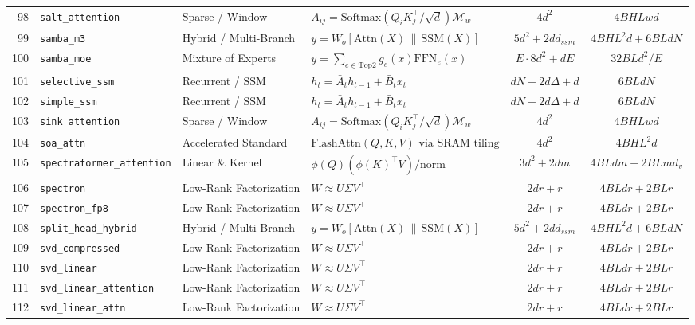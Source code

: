 \begin{center}
\begin{longtable}{rlllcc}
98 & \texttt{salt\_attention} & Sparse / Window & $A_{ij} = \text{Softmax}(Q_i K_j^\top / \sqrt{d}) \mathcal{M}_w$ & $4 d^2$ & $4 B H L w d$ \\
99 & \texttt{samba\_m3} & Hybrid / Multi-Branch & $y = W_o [\text{Attn}(X) \,\|\, \text{SSM}(X)]$ & $5 d^2 + 2 d d_{ssm}$ & $4 B H L^2 d + 6 B L d N$ \\
100 & \texttt{samba\_moe} & Mixture of Experts & $y = \sum_{e \in \text{Top2}} g_e(x) \text{FFN}_e(x)$ & $E \cdot 8 d^2 + d E$ & $32 B L d^2 / E$ \\
101 & \texttt{selective\_ssm} & Recurrent / SSM & $h_t = \bar{A}_t h_{t-1} + \bar{B}_t x_t$ & $d N + 2 d \Delta + d$ & $6 B L d N$ \\
102 & \texttt{simple\_ssm} & Recurrent / SSM & $h_t = \bar{A}_t h_{t-1} + \bar{B}_t x_t$ & $d N + 2 d \Delta + d$ & $6 B L d N$ \\
103 & \texttt{sink\_attention} & Sparse / Window & $A_{ij} = \text{Softmax}(Q_i K_j^\top / \sqrt{d}) \mathcal{M}_w$ & $4 d^2$ & $4 B H L w d$ \\
104 & \texttt{soa\_attn} & Accelerated Standard & $\text{FlashAttn}(Q,K,V) \text{ via SRAM tiling}$ & $4 d^2$ & $4 B H L^2 d$ \\
105 & \texttt{spectraformer\_attention} & Linear \& Kernel & $\phi(Q)(\phi(K)^\top V) / \text{norm}$ & $3 d^2 + 2 d m$ & $4 B L d m + 2 B L m d_v$ \\
106 & \texttt{spectron} & Low-Rank Factorization & $W \approx U \Sigma V^\top$ & $2 d r + r$ & $4 B L d r + 2 B L r$ \\
107 & \texttt{spectron\_fp8} & Low-Rank Factorization & $W \approx U \Sigma V^\top$ & $2 d r + r$ & $4 B L d r + 2 B L r$ \\
108 & \texttt{split\_head\_hybrid} & Hybrid / Multi-Branch & $y = W_o [\text{Attn}(X) \,\|\, \text{SSM}(X)]$ & $5 d^2 + 2 d d_{ssm}$ & $4 B H L^2 d + 6 B L d N$ \\
109 & \texttt{svd\_compressed} & Low-Rank Factorization & $W \approx U \Sigma V^\top$ & $2 d r + r$ & $4 B L d r + 2 B L r$ \\
110 & \texttt{svd\_linear} & Low-Rank Factorization & $W \approx U \Sigma V^\top$ & $2 d r + r$ & $4 B L d r + 2 B L r$ \\
111 & \texttt{svd\_linear\_attention} & Low-Rank Factorization & $W \approx U \Sigma V^\top$ & $2 d r + r$ & $4 B L d r + 2 B L r$ \\
112 & \texttt{svd\_linear\_attn} & Low-Rank Factorization & $W \approx U \Sigma V^\top$ & $2 d r + r$ & $4 B L d r + 2 B L r$ \\

\end{longtable}
\end{center}
